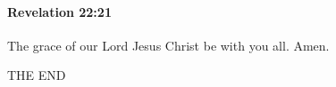 		\paragraph{Revelation 22:21} %
			\label{REVELATIONNT-22-21}

			The grace of our Lord Jesus Christ be with you all. Amen.
			
			THE END

			\begin{framed}
			\scriptsize
				\begin{compactdesc}
					\item[SBLG] \gr{---}
				\end{compactdesc}
			\end{framed}